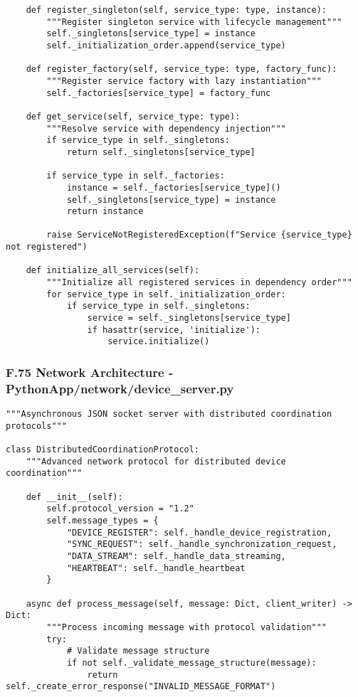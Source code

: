 \documentclass[11pt,a4paper]{article}
\begin{document}
{{\begin{verbatim}
    def register_singleton(self, service_type: type, instance):
        """Register singleton service with lifecycle management"""
        self._singletons[service_type] = instance
        self._initialization_order.append(service_type)

    def register_factory(self, service_type: type, factory_func):
        """Register service factory with lazy instantiation"""
        self._factories[service_type] = factory_func

    def get_service(self, service_type: type):
        """Resolve service with dependency injection"""
        if service_type in self._singletons:
            return self._singletons[service_type]

        if service_type in self._factories:
            instance = self._factories[service_type]()
            self._singletons[service_type] = instance
            return instance

        raise ServiceNotRegisteredException(f"Service {service_type} not registered")

    def initialize_all_services(self):
        """Initialize all registered services in dependency order"""
        for service_type in self._initialization_order:
            if service_type in self._singletons:
                service = self._singletons[service_type]
                if hasattr(service, 'initialize'):
                    service.initialize()
\end{verbatim}

\subsubsection{F.75 Network Architecture - PythonApp/network/device_server.py}

\begin{verbatim}
"""Asynchronous JSON socket server with distributed coordination protocols"""

class DistributedCoordinationProtocol:
    """Advanced network protocol for distributed device coordination"""

    def __init__(self):
        self.protocol_version = "1.2"
        self.message_types = {
            "DEVICE_REGISTER": self._handle_device_registration,
            "SYNC_REQUEST": self._handle_synchronization_request,
            "DATA_STREAM": self._handle_data_streaming,
            "HEARTBEAT": self._handle_heartbeat
        }

    async def process_message(self, message: Dict, client_writer) -> Dict:
        """Process incoming message with protocol validation"""
        try:
            # Validate message structure
            if not self._validate_message_structure(message):
                return self._create_error_response("INVALID_MESSAGE_FORMAT")


\end{verbatim}}}
\end{document}
